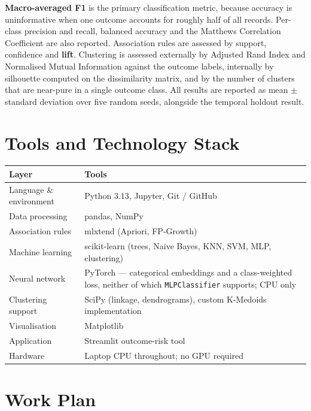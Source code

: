 \documentclass[11pt,a4paper]{article}
\begin{document}
\textbf{Macro-averaged F1} is the primary classification metric, because accuracy is
uninformative when one outcome accounts for roughly half of all records. Per-class
precision and recall, balanced accuracy and the Matthews Correlation Coefficient are
also reported. Association rules are assessed by support, confidence and \textbf{lift}.
Clustering is assessed externally by Adjusted Rand Index and Normalised Mutual
Information against the outcome labels, internally by silhouette computed on the
dissimilarity matrix, and by the number of clusters that are near-pure in a single
outcome class. All results are reported as mean $\pm$ standard deviation over five
random seeds, alongside the temporal holdout result.

\section*{Tools and Technology Stack}

\begin{center}
\begin{tabular}{@{}L{3.6cm}L{11.7cm}@{}}
\toprule
\textbf{Layer} & \textbf{Tools} \\
\midrule
Language \& environment & Python 3.13, Jupyter, Git / GitHub \\
Data processing & pandas, NumPy \\
Association rules & mlxtend (Apriori, FP-Growth) \\
Machine learning & scikit-learn (trees, Naive Bayes, KNN, SVM, MLP, clustering) \\
Neural network & PyTorch --- categorical embeddings and a class-weighted loss,
neither of which \texttt{MLPClassifier} supports; CPU only \\
Clustering support & SciPy (linkage, dendrograms), custom K-Medoids implementation \\
Visualisation & Matplotlib \\
Application & Streamlit outcome-risk tool \\
Hardware & Laptop CPU throughout; no GPU required \\
\bottomrule
\end{tabular}
\end{center}

\section*{Work Plan}
\end{document}

